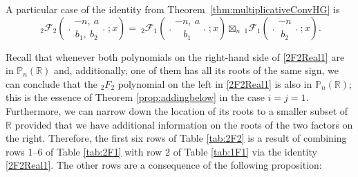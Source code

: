 \documentclass[reqno,11pt]{amsart}
\theoremstyle{remark}
\renewcommand{\P}{\mathbb{P}}
\newcommand{\R}{\mathbb{R}}
\newcommand{\rr}{\mathbb{R}}
\newcommand*\pFq[5]{%
 {\ }_{#1}{\mathcal F}_{#2}{\left(\genfrac..{0pt}{}{#3}{#4};#5\right)}%
}
\begin{document}
A particular case of the identity from Theorem~\ref{thm:multiplicativeConvHG} is
\begin{equation} \label{2F2Real1}
    \pFq{2}{2}{-n,\ a}{b_1,\ b_2}{x}=\pFq{2}{1}{-n,\ a}{b_1}{x} \boxtimes_n \pFq{1}{1}{-n}{b_2}{x}.
\end{equation}

Recall that whenever both polynomials on the right-hand side of \eqref{2F2Real1} are in $\P_n(\rr)$ and, additionally, one of them has all its roots of the same sign,  we can conclude that the ${}_2F_2$ polynomial on the left in \eqref{2F2Real1} is also in $\P_n(\rr)$; this is the essence of Theorem \ref{prop:addingbelow} in the case $i=j=1$. Furthermore, we can narrow down the location of its roots to a smaller subset of $\R$ provided that we have additional information on the roots of the two factors on the right.  Therefore, the first six rows of Table \ref{tab:2F2} is a result of combining rows 1--6 of Table \ref{tab:2F1} with row 2 of Table \ref{tab:1F1} via the identity \eqref{2F2Real1}. The other rows are a consequence of the following proposition:
\end{document}
